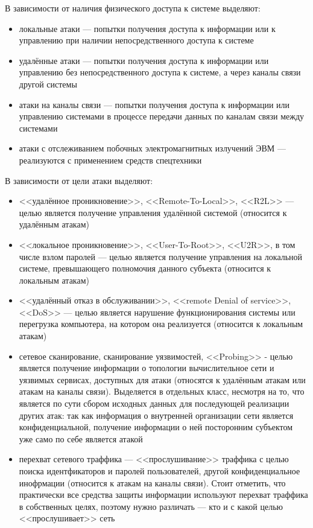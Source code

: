 В зависимости от наличия физического доступа к системе выделяют:

\begin{itemize}

\item локальные атаки --- попытки получения доступа к информации или к управлению при наличии непосредственного доступа к системе

\item удалённые атаки --- попытки получения доступа к информации или управлению без непосредственного доступа к системе, а через каналы связи другой системы

\item атаки на каналы связи --- попытки получения доступа к информации или управлению системами в процессе передачи данных по каналам связи между системами

\item атаки с отслеживанием побочных электромагнитных излучений ЭВМ --- реализуются с применением средств спецтехники

\end{itemize}

В зависимости от цели атаки выделяют:

\begin{itemize}

\item <<удалённое проникновение>>, <<Remote-To-Local>>, <<R2L>> --- целью является получение управления удалённой системой (относится к удалённым атакам)

\item <<локальное проникновение>>, <<User-To-Root>>, <<U2R>>, в том числе взлом паролей --- целью является получение управления на локальной системе, превышающего полномочия данного субъекта (относится к локальным атакам)

\item <<удалённый отказ в обслуживании>>, <<remote Denial of service>>, <<DoS>> --- целью является нарушение функционирования системы или перегрузка компьютера, на котором она реализуется (относится к локальным атакам)

\item сетевое сканирование, сканирование уязвимостей, <<Probing>> - целью является получение информации о топологии вычислительное сети и уязвимых сервисах, доступных для атаки (относятся к удалённым атакам или атакам на каналы связи). Выделяется в отдельных класс, несмотря на то, что является по сути сбором исходных данных для последующей реализации других атак: так как информация о внутренней организации сети является конфиденциальной, получение информации о ней посторонним субъектом уже само по себе является атакой

\item перехват сетевого траффика --- <<прослушивание>> траффика с целью поиска идентфикаторов и паролей пользователей, другой конфиденциальное инофрмации (относится к атакам на каналы связи). Стоит отметить, что практически все средства защиты информации используют перехват траффика в собственных целях, поэтому нужно различать --- кто и с какой целью <<прослушивает>> сеть

\end{itemize}

